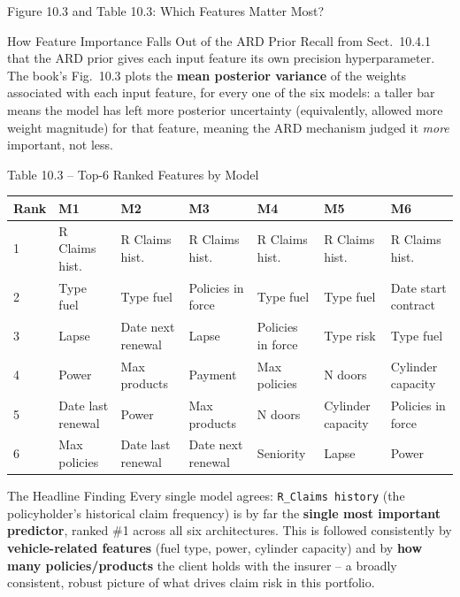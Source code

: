 \documentclass[aspectratio=169,10pt]{beamer}
\begin{document}
\begin{frame}[allowframebreaks]{Figure 10.3 and Table 10.3: Which Features Matter Most?}

  \begin{block}{How Feature Importance Falls Out of the ARD Prior}
    Recall from Sect.\ 10.4.1 that the ARD prior gives each input feature its
    own precision hyperparameter. The book's Fig.\ 10.3 plots the
    \textbf{mean posterior variance} of the weights associated with each
    input feature, for every one of the six models: a taller bar means the
    model has left more posterior uncertainty (equivalently, allowed more
    weight magnitude) for that feature, meaning the ARD mechanism judged it
    \emph{more} important, not less.
  \end{block}

  \begin{block}{Table 10.3 -- Top-6 Ranked Features by Model}
    \begin{center}
    {\scriptsize
    \begin{tabular}{lllllll}
      \toprule
      \textbf{Rank} & \textbf{M1} & \textbf{M2} & \textbf{M3} & \textbf{M4} & \textbf{M5} & \textbf{M6} \\
      \midrule
      1 & R Claims hist. & R Claims hist. & R Claims hist. & R Claims hist. & R Claims hist. & R Claims hist. \\
      2 & Type fuel & Type fuel & Policies in force & Type fuel & Type fuel & Date start contract \\
      3 & Lapse & Date next renewal & Lapse & Policies in force & Type risk & Type fuel \\
      4 & Power & Max products & Payment & Max policies & N doors & Cylinder capacity \\
      5 & Date last renewal & Power & Max products & N doors & Cylinder capacity & Policies in force \\
      6 & Max policies & Date last renewal & Date next renewal & Seniority & Lapse & Power \\
      \bottomrule
    \end{tabular}
    }
    \end{center}
  \end{block}

  \begin{alertblock}{The Headline Finding}
    Every single model agrees: \texttt{R\_Claims history} (the policyholder's
    historical claim frequency) is by far the \textbf{single most important
    predictor}, ranked \#1 across all six architectures. This is followed
    consistently by \textbf{vehicle-related features} (fuel type, power,
    cylinder capacity) and by \textbf{how many policies/products} the client
    holds with the insurer -- a broadly consistent, robust picture of what
    drives claim risk in this portfolio.
  \end{alertblock}

\end{frame}
\end{document}
